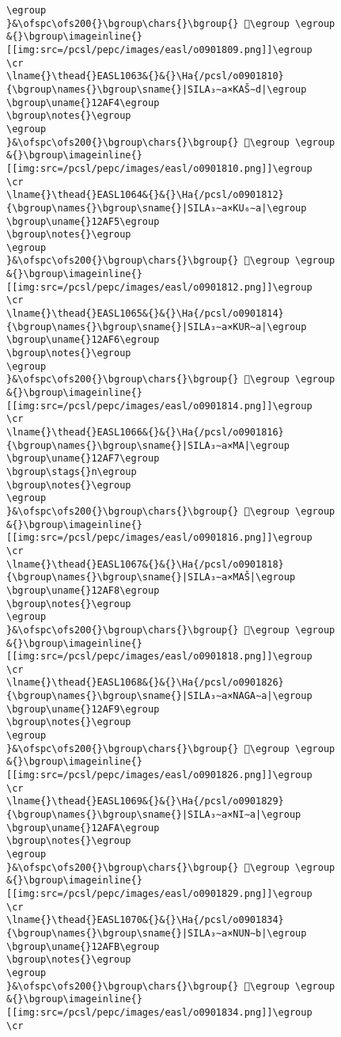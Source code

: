 \begin{verbatim}
\egroup
}&\ofspc\ofs200{}\bgroup\chars{}\bgroup{} 𒫳\egroup \egroup
&{}\bgroup\imageinline{}[[img:src=/pcsl/pepc/images/easl/o0901809.png]]\egroup
\cr
\lname{}\thead{}EASL1063&{}&{}\Ha{/pcsl/o0901810}{\bgroup\names{}\bgroup\sname{}|SILA₃∼a×KAŠ∼d|\egroup
\bgroup\uname{}12AF4\egroup
\bgroup\notes{}\egroup
\egroup
}&\ofspc\ofs200{}\bgroup\chars{}\bgroup{} 𒫴\egroup \egroup
&{}\bgroup\imageinline{}[[img:src=/pcsl/pepc/images/easl/o0901810.png]]\egroup
\cr
\lname{}\thead{}EASL1064&{}&{}\Ha{/pcsl/o0901812}{\bgroup\names{}\bgroup\sname{}|SILA₃∼a×KU₆∼a|\egroup
\bgroup\uname{}12AF5\egroup
\bgroup\notes{}\egroup
\egroup
}&\ofspc\ofs200{}\bgroup\chars{}\bgroup{} 𒫵\egroup \egroup
&{}\bgroup\imageinline{}[[img:src=/pcsl/pepc/images/easl/o0901812.png]]\egroup
\cr
\lname{}\thead{}EASL1065&{}&{}\Ha{/pcsl/o0901814}{\bgroup\names{}\bgroup\sname{}|SILA₃∼a×KUR∼a|\egroup
\bgroup\uname{}12AF6\egroup
\bgroup\notes{}\egroup
\egroup
}&\ofspc\ofs200{}\bgroup\chars{}\bgroup{} 𒫶\egroup \egroup
&{}\bgroup\imageinline{}[[img:src=/pcsl/pepc/images/easl/o0901814.png]]\egroup
\cr
\lname{}\thead{}EASL1066&{}&{}\Ha{/pcsl/o0901816}{\bgroup\names{}\bgroup\sname{}|SILA₃∼a×MA|\egroup
\bgroup\uname{}12AF7\egroup
\bgroup\stags{}n\egroup
\bgroup\notes{}\egroup
\egroup
}&\ofspc\ofs200{}\bgroup\chars{}\bgroup{} 𒫷\egroup \egroup
&{}\bgroup\imageinline{}[[img:src=/pcsl/pepc/images/easl/o0901816.png]]\egroup
\cr
\lname{}\thead{}EASL1067&{}&{}\Ha{/pcsl/o0901818}{\bgroup\names{}\bgroup\sname{}|SILA₃∼a×MAŠ|\egroup
\bgroup\uname{}12AF8\egroup
\bgroup\notes{}\egroup
\egroup
}&\ofspc\ofs200{}\bgroup\chars{}\bgroup{} 𒫸\egroup \egroup
&{}\bgroup\imageinline{}[[img:src=/pcsl/pepc/images/easl/o0901818.png]]\egroup
\cr
\lname{}\thead{}EASL1068&{}&{}\Ha{/pcsl/o0901826}{\bgroup\names{}\bgroup\sname{}|SILA₃∼a×NAGA∼a|\egroup
\bgroup\uname{}12AF9\egroup
\bgroup\notes{}\egroup
\egroup
}&\ofspc\ofs200{}\bgroup\chars{}\bgroup{} 𒫹\egroup \egroup
&{}\bgroup\imageinline{}[[img:src=/pcsl/pepc/images/easl/o0901826.png]]\egroup
\cr
\lname{}\thead{}EASL1069&{}&{}\Ha{/pcsl/o0901829}{\bgroup\names{}\bgroup\sname{}|SILA₃∼a×NI∼a|\egroup
\bgroup\uname{}12AFA\egroup
\bgroup\notes{}\egroup
\egroup
}&\ofspc\ofs200{}\bgroup\chars{}\bgroup{} 𒫺\egroup \egroup
&{}\bgroup\imageinline{}[[img:src=/pcsl/pepc/images/easl/o0901829.png]]\egroup
\cr
\lname{}\thead{}EASL1070&{}&{}\Ha{/pcsl/o0901834}{\bgroup\names{}\bgroup\sname{}|SILA₃∼a×NUN∼b|\egroup
\bgroup\uname{}12AFB\egroup
\bgroup\notes{}\egroup
\egroup
}&\ofspc\ofs200{}\bgroup\chars{}\bgroup{} 𒫻\egroup \egroup
&{}\bgroup\imageinline{}[[img:src=/pcsl/pepc/images/easl/o0901834.png]]\egroup
\cr

\end{verbatim}
